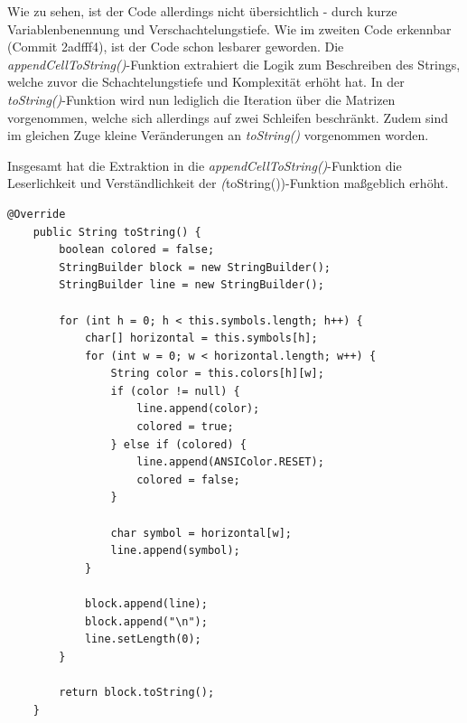 Wie zu sehen, ist der Code allerdings nicht übersichtlich - durch
kurze Variablenbenennung und Verschachtelungstiefe. Wie im zweiten
Code erkennbar (Commit 2adfff4), ist der Code schon lesbarer geworden.
Die \textit{appendCellToString()}-Funktion extrahiert die Logik
zum Beschreiben des Strings, welche zuvor die Schachtelungstiefe
und Komplexität erhöht hat. In der \textit{toString()}-Funktion
wird nun lediglich die Iteration über die Matrizen vorgenommen,
welche sich allerdings auf zwei Schleifen beschränkt. Zudem sind
im gleichen Zuge kleine Veränderungen an \textit{toString()}
vorgenommen worden.

Insgesamt hat die Extraktion in die \textit{appendCellToString()}-Funktion
die Leserlichkeit und Verständlichkeit der \textit(toString())-Funktion
maßgeblich erhöht.

\vspace{0.5cm}
\begin{lstlisting}[caption={Refactorings: Extract Method (Vorher)}]
    @Override
    public String toString() {
        boolean colored = false;
        StringBuilder block = new StringBuilder();
        StringBuilder line = new StringBuilder();
        
        for (int h = 0; h < this.symbols.length; h++) {
            char[] horizontal = this.symbols[h];
            for (int w = 0; w < horizontal.length; w++) {
                String color = this.colors[h][w];
                if (color != null) {
                    line.append(color);
                    colored = true;
                } else if (colored) {
                    line.append(ANSIColor.RESET);
                    colored = false;
                }
                
                char symbol = horizontal[w];
                line.append(symbol);
            }
            
            block.append(line);
            block.append("\n");
            line.setLength(0);
        }
        
        return block.toString();
    }
\end{lstlisting}

